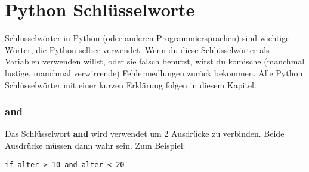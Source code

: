 

\chapter{Python Schlüsselworte}\label{app:pythonkeywords}

Schlüsselwörter in Python (oder anderen Programmiersprachen) sind wichtige Wörter, die Python selber verwendet. Wenn du diese Schlüsselwörter als Variablen verwenden willst, oder sie falsch benutzt, wirst du komische (manchmal lustige, manchmal verwirrende) Fehlermedlungen zurück bekommen. Alle Python Schlüsselwörter mit einer kurzen Erklärung folgen in diesem Kapitel.

\subsection*{and}

Das Schlüsselwort \textbf{and} wird verwendet um 2 Ausdrücke zu verbinden. Beide Ausdrücke müssen dann wahr sein. Zum Beispiel:

\begin{Verbatim}[frame=single]
if alter > 10 and alter < 20
\end{Verbatim}

